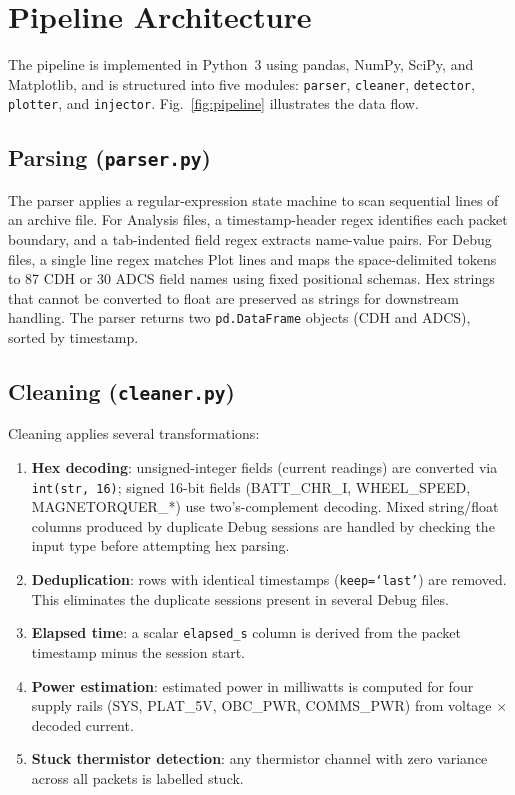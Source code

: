 \documentclass[conference]{IEEEtran}
\begin{document}
\section{Pipeline Architecture}
\label{sec:pipeline}

The pipeline is implemented in Python~3 using pandas, NumPy, SciPy,
and Matplotlib, and is structured into five modules:
\texttt{parser}, \texttt{cleaner}, \texttt{detector},
\texttt{plotter}, and \texttt{injector}.
Fig.~\ref{fig:pipeline} illustrates the data flow.

\subsection{Parsing (\texttt{parser.py})}

The parser applies a regular-expression state machine to scan
sequential lines of an archive file.  For Analysis files, a
timestamp-header regex identifies each packet boundary, and a
tab-indented field regex extracts name-value pairs.  For Debug files,
a single line regex matches Plot lines and maps the space-delimited
tokens to 87 CDH or 30 ADCS field names using fixed positional
schemas.  Hex strings that cannot be converted to float are preserved
as strings for downstream handling.  The parser returns two
\texttt{pd.DataFrame} objects (CDH and ADCS), sorted by timestamp.

\subsection{Cleaning (\texttt{cleaner.py})}

Cleaning applies several transformations:
\begin{enumerate}
  \item \textbf{Hex decoding}: unsigned-integer fields (current
        readings) are converted via \texttt{int(str, 16)}; signed
        16-bit fields (BATT\_CHR\_I, WHEEL\_SPEED, MAGNETORQUER\_*) use
        two's-complement decoding.  Mixed string/float columns produced
        by duplicate Debug sessions are handled by checking the input
        type before attempting hex parsing.
  \item \textbf{Deduplication}: rows with identical timestamps
        (\texttt{keep=`last'}) are removed.  This eliminates the
        duplicate sessions present in several Debug files.
  \item \textbf{Elapsed time}: a scalar \texttt{elapsed\_s} column is
        derived from the packet timestamp minus the session start.
  \item \textbf{Power estimation}: estimated power in milliwatts is
        computed for four supply rails (SYS, PLAT\_5V, OBC\_PWR,
        COMMS\_PWR) from voltage $\times$ decoded current.
  \item \textbf{Stuck thermistor detection}: any thermistor channel
        with zero variance across all packets is labelled stuck.
\end{enumerate}
\end{document}
